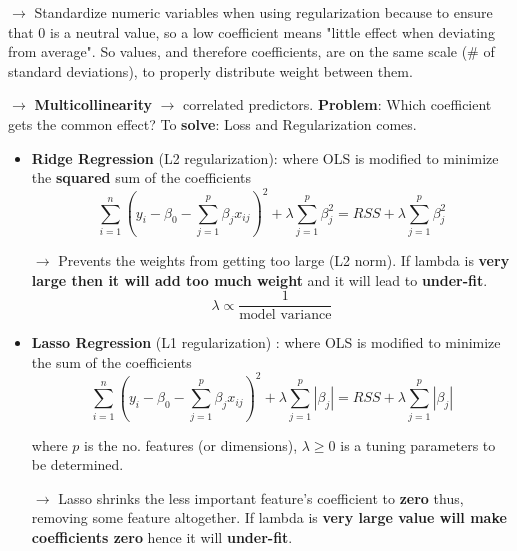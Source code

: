 \documentclass[letterpaper, 10.5pt,landscape]{article}
\begin{document}
\begin{multicols*}{3}
$\rightarrow$ Standardize numeric variables when using regularization because to ensure that 0 is a neutral value, so a low coefficient means "little effect when deviating from average". So values, and therefore coefficients, are on the same scale (\# of standard deviations), to properly distribute weight between them.

$\rightarrow$ \textbf{Multicollinearity} $\rightarrow$ correlated predictors. \textbf{Problem}: Which coefficient gets the common effect? To \textbf{solve}: Loss and Regularization comes. \\


\begin{itemize}

     \item \textbf{Ridge Regression} (L2 regularization): where OLS is modified to minimize the \textbf{squared} sum of the coefficients 
     \vspace{-5pt}
    \[ \boxed{\sum^{n}_{i=1} (y_{i} - \beta_{0} - \sum^{p}_{j=1} \beta_{j} x_{ij})^{2} + \lambda \sum^{p}_{j=1} \beta^{2}_{j} = RSS + \lambda \sum^{p}_{j=1} \beta^{2}_{j}} \]
    \vspace{-7pt}
    
   $\rightarrow$ Prevents the weights from getting too large (L2 norm). If lambda is \textbf{very large then it will add too much weight} and it will lead to \textbf{under-fit}.
   \vspace{-5pt}
   \[ \boxed{ \lambda \propto \frac{1} {\text{model variance}}}  \]
    
    \item \textbf{Lasso Regression} (L1 regularization) : where OLS is modified to minimize the sum of the coefficients 
    \vspace{-5pt}
    \[ \boxed{\sum^{n}_{i=1} (y_{i} - \beta_{0} - \sum^{p}_{j=1} \beta_{j} x_{ij})^{2} + \lambda \sum^{p}_{j=1} \left| \beta_{j} \right| = RSS + \lambda \sum^{p}_{j=1} \left| \beta_{j} \right|}  \]
    \vspace{-10pt}
     
    where $p$ is the no. features (or dimensions), $\lambda \geq 0$ is a tuning parameters to be determined. 
    
    \vspace{2pt}
    
   $\rightarrow$ Lasso shrinks the less important feature’s coefficient to \textbf{zero} thus, removing some feature altogether. If lambda is \textbf{very large value will make coefficients zero} hence it will \textbf{under-fit}.
   \vspace{-3pt}
\end{itemize}


\end{multicols*}
\end{document}
